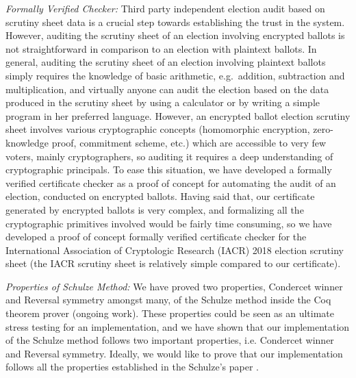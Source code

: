 \noindent 
\textit{Formally Verified Checker:} Third party independent election audit based on scrutiny sheet data is a crucial step towards 
establishing the trust in the system.   However, auditing the scrutiny sheet of an election involving encrypted ballots
is not straightforward in comparison to an election with plaintext ballots. 
In general, auditing the scrutiny sheet of an election involving 
plaintext ballots simply requires the knowledge of basic arithmetic, e.g.~addition, subtraction and multiplication, 
and virtually anyone can audit the election based on the data produced in the scrutiny sheet by
using a calculator or by writing a simple program in her preferred language. 
However, an encrypted ballot election scrutiny sheet involves various
cryptographic concepts (homomorphic encryption, zero-knowledge proof, commitment scheme, etc.) 
which are accessible to very few voters, mainly cryptographers,  so auditing it 
requires a deep understanding of cryptographic principals. To ease this situation, we have developed a formally verified 
certificate checker as a proof of concept for automating the audit of an election, conducted on encrypted ballots. 
Having said that,  our certificate generated by encrypted ballots is very complex, and formalizing all the cryptographic 
primitives involved would be fairly time consuming, so we have developed a proof of concept 
formally verified certificate checker for the International Association of Cryptologic Research (IACR) 2018 election
scrutiny sheet (the IACR scrutiny sheet is relatively simple compared to our certificate).

\noindent
\textit{Properties of Schulze Method:} We have proved two properties,  Condercet winner and Reversal symmetry 
amongst many, of the Schulze method inside the Coq theorem prover (ongoing work).  These properties could be seen as an 
ultimate stress testing for an implementation, and we have shown that our implementation of the Schulze 
method follows two important properties,  i.e.  Condercet winner and Reversal symmetry.  Ideally,  
we would like to prove that our implementation follows all the properties established in the Schulze's 
paper  \citep{Schulze:2011:NMC}.


